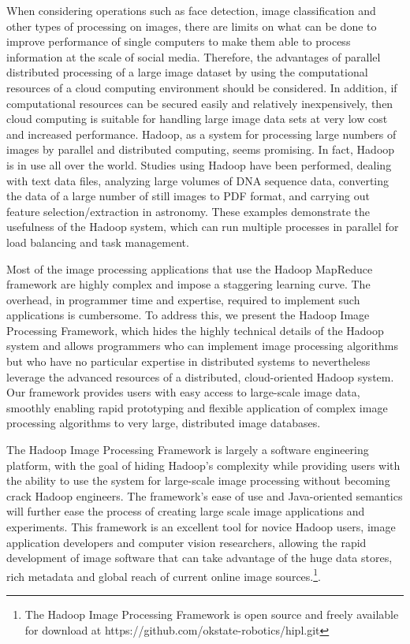 \documentclass[conference]{IEEEtran}
\begin{document}
When considering operations such as face detection, image
classification\cite{Li2009} and other types of processing on images,
there are limits on what can be done to improve performance of single
computers to make them able to process information at the scale of
social media. Therefore, the advantages of parallel distributed
processing of a large image dataset by using the computational
resources of a cloud computing environment should be considered. In
addition, if computational resources can be secured easily and
relatively inexpensively, then cloud computing is suitable for
handling large image data sets at very low cost and increased
performance. Hadoop, as a system for processing large numbers of
images by parallel and distributed computing, seems promising. In
fact, Hadoop is in use all over the world. Studies using Hadoop have
been performed, dealing with text data files\cite{Lin2010}, analyzing
large volumes of DNA sequence data\cite{McKenna2010}, converting the
data of a large number of still images to PDF format, and carrying out
feature selection/extraction in astronomy\cite{wiley2011}.  These
examples demonstrate the usefulness of the Hadoop system, which can
run multiple processes in parallel for load balancing and task
management.
	
Most of the image processing applications that use the Hadoop
MapReduce framework are highly complex and impose a staggering
learning curve.  The overhead, in programmer time and expertise,
required to implement such applications is cumbersome.  To address
this, we present the Hadoop Image Processing Framework, which hides
the highly technical details of the Hadoop system and allows
programmers who can implement image processing algorithms but who have
no particular expertise in distributed systems to nevertheless
leverage the advanced resources of a distributed, cloud-oriented
Hadoop system. Our framework provides users with easy access to
large-scale image data, smoothly enabling rapid prototyping and
flexible application of complex image processing algorithms to very
large, distributed image databases.
	
The Hadoop Image Processing Framework is largely a software
engineering platform, with the goal of hiding Hadoop's complexity
while providing users with the ability to use the system for
large-scale image processing without becoming crack Hadoop engineers.
The framework's ease of use and Java-oriented semantics will further
ease the process of creating large scale image applications and
experiments. This framework is an excellent tool for novice Hadoop
users, image application developers and computer vision researchers,
allowing the rapid development of image software that can take
advantage of the huge data stores, rich metadata and global reach of
current online image sources.\footnote[1]{The Hadoop Image Processing
  Framework is open source and freely available for download at
  https://github.com/okstate-robotics/hipl.git}.
	
\end{document}
